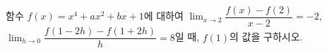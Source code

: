 함수 $f(x)=x^4+ax^2+bx+1$에 대하여 $\displaystyle\lim_{x\to 2}\dfrac{f(x)-f(2)}{x-2}=-2$, $\displaystyle\lim_{h\to 0}\dfrac{f(1-2h)-f(1+2h)}{h}=8$일 때, $f(1)$의 값을 구하시오. 
